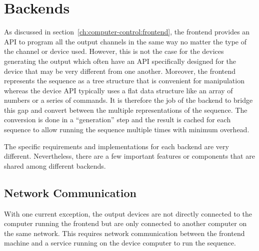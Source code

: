 \section{Backends}
\label{ch:computer-control:backend}
As discussed in section~\ref{ch:computer-control:frontend},
the frontend provides an API to program all the output channels in the same way
no matter the type of the channel or device used.
However, this is not the case for the devices generating the output
which often have an API specifically designed for the device
that may be very different from one another.
Moreover, the frontend represents the sequence as a tree structure
that is convenient for manipulation
whereas the device API typically uses a flat data structure like an array of numbers
or a series of commands.
It is therefore the job of the backend to bridge this gap
and convert between the multiple representations of the sequence.
The conversion is done in a ``generation'' step and
the result is cached for each sequence to allow running the sequence
multiple times with minimum overhead.

The specific requirements and implementations for each backend are very different.
Nevertheless, there are a few important features or components that are shared among
different backends.

\subsection{Network Communication}
\label{ch:computer-control:backend:net}
With one current exception, the output devices are not directly connected to
the computer running the frontend but are only connected to another computer
on the same network.
This requires network communication between the frontend machine and
a service running on the device computer to run the sequence.

